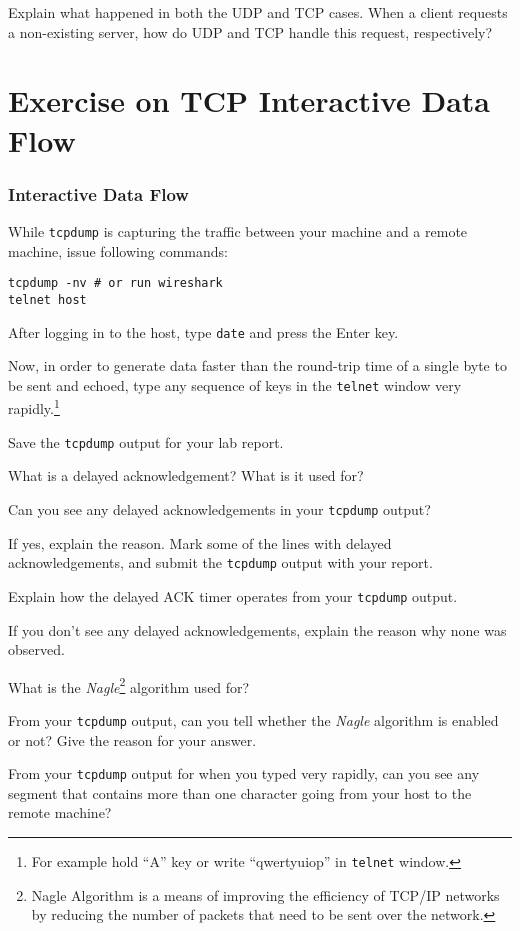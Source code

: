 \documentclass{../UTNetLab}
\begin{document}
    \begin{report}
        \item Explain what happened in both the UDP and TCP cases.
                When a client requests a non-existing server, how do UDP and TCP handle this request, respectively?
    \end{report}

\part{Exercise on TCP Interactive Data Flow}
\section{Interactive Data Flow}
While \lstinline{tcpdump} is capturing the traffic between your machine and a remote machine, issue following commands:
    \begin{lstlisting}[emph={host}]
tcpdump -nv # or run wireshark
telnet host
    \end{lstlisting}
    After logging in to the host, type \lstinline{date} and press the {Enter} key.

    Now, in order to generate data faster than the round-trip time of a single byte to be sent and echoed, type any sequence of keys in the \lstinline{telnet} window very rapidly.\footnote{For example hold ``A'' key or write ``qwertyuiop'' in \lstinline{telnet} window.}

    {Save} the \lstinline{tcpdump} output for your lab report.
    
    \begin{report}
    \item What is a delayed acknowledgement?
    What is it used for?
    
    \item Can you see any delayed acknowledgements in your \lstinline{tcpdump} output?

    If yes, explain the reason.
    Mark some of the lines with delayed acknowledgements, and submit the \lstinline{tcpdump} output with your report.

    Explain how the delayed ACK timer operates from your \lstinline{tcpdump} output.

    If you don’t see any delayed acknowledgements, explain the reason why none was observed.
    
    \item What is the \textit{Nagle}\footnote{Nagle Algorithm is a means of improving the efficiency of TCP/IP networks by reducing the number of packets that need to be sent over the network.} algorithm used for?

    From your \lstinline{tcpdump} output, can you tell whether the \textit{Nagle} algorithm is enabled or not? Give the reason for your answer.

    From your \lstinline{tcpdump} output for when you typed very rapidly, can you see any segment that contains more than one character going from your host to the remote machine?
    \end{report}
\end{document}

